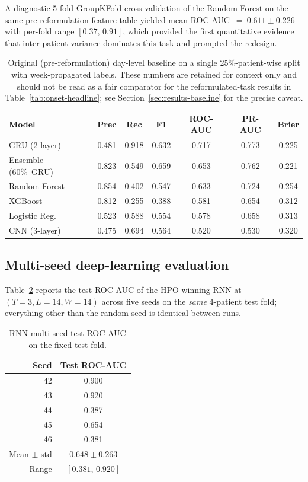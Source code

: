 \documentclass[11pt,a4paper]{article}
\newcommand{\rocauc}{ROC\nobreakdash-AUC}
\newcommand{\prauc}{PR\nobreakdash-AUC}
\begin{document}
A diagnostic 5-fold GroupKFold cross-validation of the Random
Forest on the same pre-reformulation feature table yielded mean
\rocauc{}~$=~0.611\pm 0.226$ with per-fold range $[0.37,\,0.91]$,
which provided the first quantitative evidence that inter-patient
variance dominates this task and prompted the redesign.

\begin{table}[H]
\centering
\caption{Original (pre-reformulation) day-level baseline on a
single 25\%-patient-wise split with week-propagated labels.  These
numbers are retained for context only and should not be read as a
fair comparator for the reformulated-task results in
Table~\ref{tab:onset-headline}; see Section~\ref{sec:results-baseline}
for the precise caveat.}
\label{tab:phase1}
\small
\begin{tabular}{lcccccc}
\toprule
\textbf{Model} & \textbf{Prec} & \textbf{Rec} & \textbf{F1} &
\textbf{\rocauc{}} & \textbf{\prauc{}} & \textbf{Brier} \\
\midrule
GRU (2-layer)       & 0.481 & 0.918 & 0.632 & 0.717 & 0.773 & 0.225 \\
Ensemble (60\%~GRU) & 0.823 & 0.549 & 0.659 & 0.653 & 0.762 & 0.221 \\
Random Forest       & 0.854 & 0.402 & 0.547 & 0.633 & 0.724 & 0.254 \\
XGBoost             & 0.812 & 0.255 & 0.388 & 0.581 & 0.654 & 0.312 \\
Logistic Reg.       & 0.523 & 0.588 & 0.554 & 0.578 & 0.658 & 0.313 \\
CNN (3-layer)       & 0.475 & 0.694 & 0.564 & 0.520 & 0.530 & 0.320 \\
\bottomrule
\end{tabular}
\end{table}

\subsection{Multi-seed deep-learning evaluation}\label{sec:results-multiseed}

Table~\ref{tab:rnn-multiseed} reports the test \rocauc{} of the
HPO-winning RNN at $(T=3,L=14,W=14)$ across five seeds on the
\emph{same} 4-patient test fold; everything other than the random
seed is identical between runs.

\begin{table}[H]
\centering
\caption{RNN multi-seed test \rocauc{} on the fixed test fold.}
\label{tab:rnn-multiseed}
\small
\begin{tabular}{rc}
\toprule
\textbf{Seed} & \textbf{Test \rocauc{}} \\
\midrule
42 & 0.900 \\
43 & 0.920 \\
44 & 0.387 \\
45 & 0.654 \\
46 & 0.381 \\
\midrule
Mean $\pm$ std & $0.648 \pm 0.263$ \\
Range          & $[0.381,\,0.920]$ \\
\bottomrule
\end{tabular}
\end{table}
\end{document}

